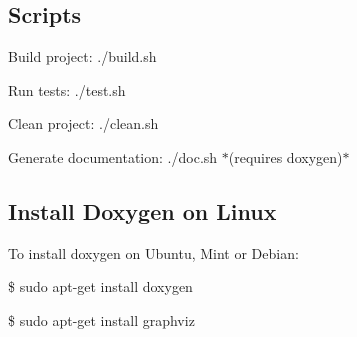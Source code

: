 \subsection*{Scripts}


\begin{DoxyItemize}
\item Build project\+: {\ttfamily ./build.sh}
\item Run tests\+: {\ttfamily ./test.sh}
\item Clean project\+: {\ttfamily ./clean.sh}
\item Generate documentation\+: {\ttfamily ./doc.sh} $\ast$(requires doxygen)$\ast$
\end{DoxyItemize}

\subsection*{Install Doxygen on Linux}

To install doxygen on Ubuntu, Mint or Debian\+:

{\ttfamily \$ sudo apt-\/get install doxygen}

{\ttfamily \$ sudo apt-\/get install graphviz} 